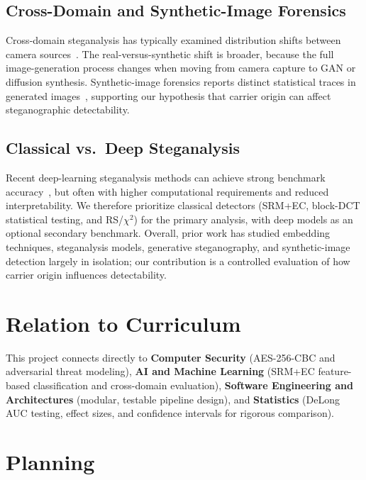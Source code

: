\documentclass[10pt,twocolumn,a4paper]{article}
\begin{document}
\subsection{Cross-Domain and Synthetic-Image Forensics}
Cross-domain steganalysis has typically examined distribution shifts between camera sources~\cite{fridrich2012srm}. The real-versus-synthetic shift is broader, because the full image-generation process changes when moving from camera capture to GAN or diffusion synthesis. Synthetic-image forensics reports distinct statistical traces in generated images~\cite{wang2020cnn,corvi2023diffusion}, supporting our hypothesis that carrier origin can affect steganographic detectability.

\subsection{Classical vs.\ Deep Steganalysis}
Recent deep-learning steganalysis methods can achieve strong benchmark accuracy~\cite{luo2024survey,boroumand2019srnet}, but often with higher computational requirements and reduced interpretability. We therefore prioritize classical detectors (SRM+EC, block-DCT statistical testing, and RS/$\chi^2$) for the primary analysis, with deep models as an optional secondary benchmark. Overall, prior work has studied embedding techniques, steganalysis models, generative steganography, and synthetic-image detection largely in isolation; our contribution is a controlled evaluation of how carrier origin influences detectability.

\section{Relation to Curriculum}

This project connects directly to \textbf{Computer Security} (AES-256-CBC and adversarial threat modeling), \textbf{AI and Machine Learning} (SRM+EC feature-based classification and cross-domain evaluation), \textbf{Software Engineering and Architectures} (modular, testable pipeline design), and \textbf{Statistics} (DeLong AUC testing, effect sizes, and confidence intervals for rigorous comparison).

\section{Planning}
\end{document}
